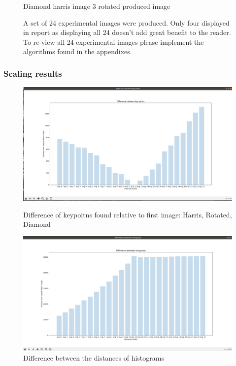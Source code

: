 \documentclass[conference]{IEEEtran}
\begin{document}
\begin{figure}[!htb]
\begin{minipage}[b]{0.2\textwidth}
    \caption{Diamond harris image 3 rotated produced image}
    \label{Diamond harris image 3 rotated produced image}
  \end{minipage}
  {\caption*{A set of 24 experimental images were produced. Only four displayed in report as displaying all 24 doesn't add great benefit to the reader. To re-view all 24 experimental images please implement the algorithms found in the appendixes.}}
\end{figure}

\subsubsection{Scaling results}
\begin{figure}[!htb]
  \centering
  \begin{minipage}[t]{0.45\textwidth}
    \includegraphics[width=\textwidth]{../programme/results/Task_1/scaled_experiements/Harris/diamond/experiment_one_diff_kp.png}
    \caption{Difference of keypoitns found relative to first image: Harris, Rotated, Diamond}
    \label{Difference of keypoints found relative to first image: Harris, Scaled, Diamond}
  \end{minipage}
  \hfill
  \begin{minipage}[t]{0.45\textwidth}
    \includegraphics[width=\textwidth]{../programme/results/Task_1/scaled_experiements/Harris/diamond/exp_three_diff_between_hists.png}
    \caption{Difference between the distances of histograms}
    \label{Difference between the distances of histograms: Harris, scaled, Diamond}
  \end{minipage}
\end{figure}
\end{document}
